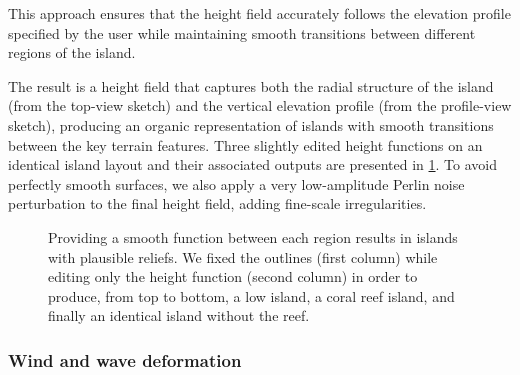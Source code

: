 This approach ensures that the height field accurately follows the elevation profile specified by the user while maintaining smooth transitions between different regions of the island.

The result is a height field that captures both the radial structure of the island (from the top-view sketch) and the vertical elevation profile (from the profile-view sketch), producing an organic representation of islands with smooth transitions between the key terrain features. Three slightly edited height functions on an identical island layout and their associated outputs are presented in \cref{fig:coral-island-procedural-smooth-heights}. To avoid perfectly smooth surfaces, we also apply a very low-amplitude Perlin noise perturbation to the final height field, adding fine-scale irregularities.

\begin{figure}
    \caption[Curve-based generation of an island, varying the shape of the profile function]{Providing a smooth function between each region results in islands with plausible reliefs. We fixed the outlines (first column) while editing only the height function (second column) in order to produce, from top to bottom, a low island, a coral reef island, and finally an identical island without the reef.}
    \label{fig:coral-island-procedural-smooth-heights}
\end{figure}

\subsubsection{Wind and wave deformation}
\label{sec:coral-island-wind-deformation}



